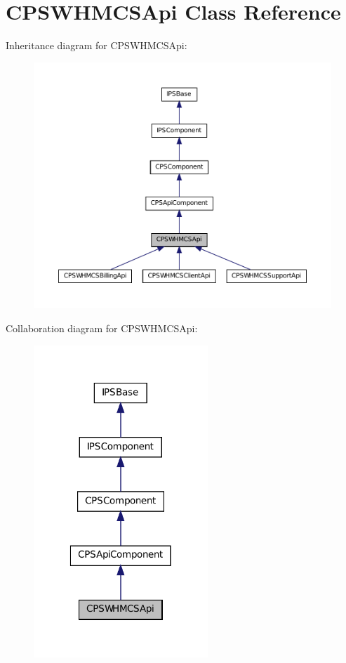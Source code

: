 \hypertarget{classCPSWHMCSApi}{
\section{CPSWHMCSApi Class Reference}
\label{classCPSWHMCSApi}
}


Inheritance diagram for CPSWHMCSApi:\nopagebreak
\begin{figure}[H]
\begin{center}
\leavevmode
\includegraphics[width=400pt]{classCPSWHMCSApi__inherit__graph}
\end{center}
\end{figure}


Collaboration diagram for CPSWHMCSApi:\nopagebreak
\begin{figure}[H]
\begin{center}
\leavevmode
\includegraphics[width=186pt]{classCPSWHMCSApi__coll__graph}
\end{center}
\end{figure}
